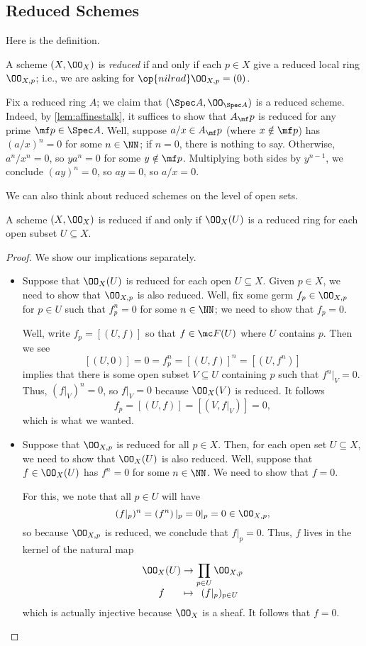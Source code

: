 \documentclass[../notes.tex]{subfiles}
\begin{document}
\subsection{Reduced Schemes}
Here is the definition.
\begin{definition}[Reduced]
	A scheme $(X,\OO_X)$ is \textit{reduced} if and only if each $p\in X$ give a reduced local ring $\OO_{X,p}$; i.e., we are asking for $\op{nilrad}\OO_{X,p}=(0)$.
\end{definition}
\begin{example} \label{ex:reduced-affine-scheme}
	Fix a reduced ring $A$; we claim that $(\Spec A,\OO_{\Spec A})$ is a reduced scheme. Indeed, by \autoref{lem:affinestalk}, it suffices to show that $A_\mf p$ is reduced for any prime $\mf p\in\Spec A$. Well, suppose $a/x\in A_\mf p$ (where $x\notin\mf p$) has $(a/x)^n=0$ for some $n\in\NN$; if $n=0$, there is nothing to say. Otherwise, $a^n/x^n=0$, so $ya^n=0$ for some $y\notin\mf p$. Multiplying both sides by $y^{n-1}$, we conclude $(ay)^n=0$, so $ay=0$, so $a/x=0$.
\end{example}
We can also think about reduced schemes on the level of open sets.
\begin{lemma} \label{lem:reduced-on-sets}
	A scheme $(X,\OO_X)$ is reduced if and only if $\OO_X(U)$ is a reduced ring for each open subset $U\subseteq X$.
\end{lemma}
\begin{proof}
	We show our implications separately.
	\begin{itemize}
		\item Suppose that $\OO_X(U)$ is reduced for each open $U\subseteq X$. Given $p\in X$, we need to show that $\OO_{X,p}$ is also reduced. Well, fix some germ $f_p\in\OO_{X,p}$ for $p\in U$ such that $f_p^n=0$ for some $n\in\NN$; we need to show that $f_p=0$.
	
		Well, write $f_p=[(U,f)]$ so that $f\in\mc F(U)$ where $U$ contains $p$. Then we see
		\[[(U,0)]=0=f_p^n=[(U,f)]^n=[(U,f^n)]\]
		implies that {there is some open subset $V\subseteq U$ containing $p$ such that $f^n|_V=0$}. Thus, $(f|_V)^n=0$, so $f|_V=0$ because $\OO_X(V)$ is reduced. It follows
		\[f_p=[(U,f)]=[(V,f|_V)]=0,\]
		which is what we wanted.
	
		\item Suppose that $\OO_{X,p}$ is reduced for all $p\in X$. Then, for each open set $U\subseteq X$, we need to show that $\OO_X(U)$ is also reduced. Well, suppose that $f\in\OO_X(U)$ has $f^n=0$ for some $n\in\NN$. We need to show that $f=0$.
	
		For this, we note that all $p\in U$ will have
		\[(f|_p)^n=\left(f^n\right)|_p=0|_p=0\in\OO_{X,p},\]
		so because $\OO_{X,p}$ is reduced, we conclude that $f|_p=0$. Thus, $f$ lives in the kernel of the natural map
		\[\arraycolsep=1.4pt\begin{array}{ccc}
			\OO_X(U) &\to& \displaystyle\prod_{p\in U}\OO_{X,p} \\
			f &\mapsto& (f|_p)_{p\in U}
		\end{array}\]
		which is actually injective because $\OO_X$ is a sheaf. It follows that $f=0$.
		\qedhere
	\end{itemize}
\end{proof}
\end{document}
